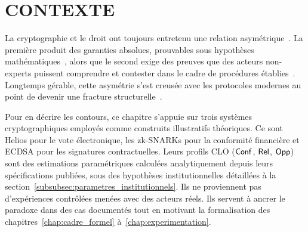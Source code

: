 
\section{CONTEXTE}
\label{sec:contexte}
\begin{sloppypar}
La cryptographie et le droit ont toujours entretenu une relation asym\'etrique~\cite{Mason07,Twining1999}.
La premi\`ere produit des garanties absolues, prouvables sous hypoth\`eses
math\'ematiques~\cite{Goldreich01,GMR88}, alors que le second exige des preuves que des
acteurs non-experts puissent comprendre et contester dans le cadre de
proc\'edures \'etablies~\cite{Daubert1993,Casey10}. Longtemps g\'erable, cette asym\'etrie s'est
creus\'ee avec les protocoles modernes au point de devenir une fracture structurelle~\cite{Citron14,Kerr04}.

Pour en d\'ecrire les contours, ce chapitre s'appuie sur trois syst\`emes
cryptographiques employ\'es comme construits illustratifs th\'eoriques. Ce sont Helios pour le vote
\'electronique, les zk-SNARKs pour la conformit\'e financi\`ere et ECDSA pour
les signatures contractuelles. Leurs profils CLO ($\mathsf{Conf}$, $\mathsf{Rel}$, $\mathsf{Opp}$)
sont des estimations param\'etriques calcul\'ees analytiquement depuis leurs
sp\'ecifications publi\'ees, sous des hypoth\`eses institutionnelles d\'etaill\'ees
\`a la section~\ref{subsubsec:parametres_institutionnels}. Ils ne proviennent pas d'exp\'eriences
contr\^ol\'ees men\'ees avec des acteurs r\'eels. Ils servent \`a ancrer le paradoxe
dans des cas document\'es tout en motivant la formalisation des chapitres~\ref{chap:cadre_formel} \`a~\ref{chap:experimentation}.
\end{sloppypar}


